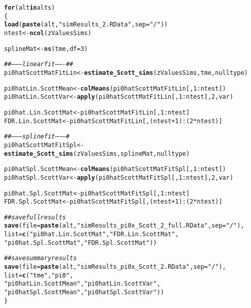 \documentclass{article}\usepackage[]{graphicx}\usepackage[]{color}
\makeatletter
\newcommand{\hlnum}[1]{\textcolor[rgb]{0.686,0.059,0.569}{#1}}%
\newcommand{\hlstr}[1]{\textcolor[rgb]{0.192,0.494,0.8}{#1}}%
\newcommand{\hlcom}[1]{\textcolor[rgb]{0.678,0.584,0.686}{\textit{#1}}}%
\newcommand{\hlopt}[1]{\textcolor[rgb]{0,0,0}{#1}}%
\newcommand{\hlstd}[1]{\textcolor[rgb]{0.345,0.345,0.345}{#1}}%
\newcommand{\hlkwa}[1]{\textcolor[rgb]{0.161,0.373,0.58}{\textbf{#1}}}%
\newcommand{\hlkwb}[1]{\textcolor[rgb]{0.69,0.353,0.396}{#1}}%
\newcommand{\hlkwc}[1]{\textcolor[rgb]{0.333,0.667,0.333}{#1}}%
\newcommand{\hlkwd}[1]{\textcolor[rgb]{0.737,0.353,0.396}{\textbf{#1}}}%
\newenvironment{kframe}{%
 \def\at@end@of@kframe{}%
 \ifinner\ifhmode%
  \def\at@end@of@kframe{\end{minipage}}%
  \begin{minipage}{\columnwidth}%
 \fi\fi%
 \def\FrameCommand##1{\hskip\@totalleftmargin \hskip-\fboxsep
 \colorbox{shadecolor}{##1}\hskip-\fboxsep
     \hskip-\linewidth \hskip-\@totalleftmargin \hskip\columnwidth}%
 \MakeFramed {\advance\hsize-\width
   \@totalleftmargin\z@ \linewidth\hsize
   \@setminipage}}%
 {\par\unskip\endMakeFramed%
 \at@end@of@kframe}
\newenvironment{knitrout}{}{} %
\makeatother
\begin{document}
\begin{knitrout}
\color{fgcolor}\begin{kframe}
\begin{alltt}
\hlkwa{for}\hlstd{(alt} \hlkwa{in} \hlstd{alts)}
\hlstd{\{}
  \hlkwd{load}\hlstd{(}\hlkwd{paste}\hlstd{(alt,}\hlstr{"simResults_2.RData"}\hlstd{,}\hlkwc{sep}\hlstd{=}\hlstr{"/"}\hlstd{))}
  \hlstd{ntest} \hlkwb{<-} \hlkwd{ncol}\hlstd{(zValuesSims)}

  \hlstd{splineMat} \hlkwb{<-} \hlkwd{ns}\hlstd{(tme,}\hlkwc{df}\hlstd{=}\hlnum{3}\hlstd{)}

  \hlcom{##--------linear fit-------##}
  \hlstd{pi0hatScottMatFitLin} \hlkwb{<-} \hlkwd{estimate_Scott_sims}\hlstd{(zValuesSims, tme, nulltype)}

  \hlstd{pi0hatLin.ScottMean} \hlkwb{<-} \hlkwd{colMeans}\hlstd{(pi0hatScottMatFitLin[,}\hlnum{1}\hlopt{:}\hlstd{ntest])}
  \hlstd{pi0hatLin.ScottVar} \hlkwb{<-} \hlkwd{apply}\hlstd{(pi0hatScottMatFitLin[,}\hlnum{1}\hlopt{:}\hlstd{ntest],}\hlnum{2}\hlstd{,var)}

  \hlstd{pi0hat.Lin.ScottMat} \hlkwb{<-} \hlstd{pi0hatScottMatFitLin[,}\hlnum{1}\hlopt{:}\hlstd{ntest]}
  \hlstd{FDR.Lin.ScottMat} \hlkwb{<-} \hlstd{pi0hatScottMatFitLin[,(ntest}\hlopt{+}\hlnum{1}\hlstd{)}\hlopt{:}\hlstd{(}\hlnum{2}\hlopt{*}\hlstd{ntest)]}

  \hlcom{##---------spline fit---------#}
  \hlstd{pi0hatScottMatFitSpl} \hlkwb{<-} \hlkwd{estimate_Scott_sims}\hlstd{(zValuesSims, splineMat, nulltype)}

  \hlstd{pi0hatSpl.ScottMean} \hlkwb{<-} \hlkwd{colMeans}\hlstd{(pi0hatScottMatFitSpl[,}\hlnum{1}\hlopt{:}\hlstd{ntest])}
  \hlstd{pi0hatSpl.ScottVar} \hlkwb{<-} \hlkwd{apply}\hlstd{(pi0hatScottMatFitSpl[,}\hlnum{1}\hlopt{:}\hlstd{ntest],}\hlnum{2}\hlstd{,var)}

  \hlstd{pi0hat.Spl.ScottMat} \hlkwb{<-} \hlstd{pi0hatScottMatFitSpl[,}\hlnum{1}\hlopt{:}\hlstd{ntest]}
  \hlstd{FDR.Spl.ScottMat} \hlkwb{<-} \hlstd{pi0hatScottMatFitSpl[,(ntest}\hlopt{+}\hlnum{1}\hlstd{)}\hlopt{:}\hlstd{(}\hlnum{2}\hlopt{*}\hlstd{ntest)]}

  \hlcom{##save full results}
  \hlkwd{save}\hlstd{(}\hlkwc{file}\hlstd{=}\hlkwd{paste}\hlstd{(alt,}\hlstr{"simResults_pi0x_Scott_2_full.RData"}\hlstd{,}\hlkwc{sep}\hlstd{=}\hlstr{"/"}\hlstd{),}
       \hlkwc{list}\hlstd{=}\hlkwd{c}\hlstd{(}\hlstr{"pi0hat.Lin.ScottMat"}\hlstd{,} \hlstr{"FDR.Lin.ScottMat"}\hlstd{,}
              \hlstr{"pi0hat.Spl.ScottMat"}\hlstd{,} \hlstr{"FDR.Spl.ScottMat"}\hlstd{))}

  \hlcom{##save summary results}
  \hlkwd{save}\hlstd{(}\hlkwc{file}\hlstd{=}\hlkwd{paste}\hlstd{(alt,}\hlstr{"simResults_pi0x_Scott_2.RData"}\hlstd{,}\hlkwc{sep}\hlstd{=}\hlstr{"/"}\hlstd{),}
       \hlkwc{list}\hlstd{=}\hlkwd{c}\hlstd{(}\hlstr{"tme"}\hlstd{,} \hlstr{"pi0"}\hlstd{,}
              \hlstr{"pi0hatLin.ScottMean"}\hlstd{,} \hlstr{"pi0hatLin.ScottVar"}\hlstd{,}
              \hlstr{"pi0hatSpl.ScottMean"}\hlstd{,} \hlstr{"pi0hatSpl.ScottVar"}\hlstd{))}
\hlstd{\}}
\end{alltt}
\end{kframe}
\end{knitrout}
\end{document}
